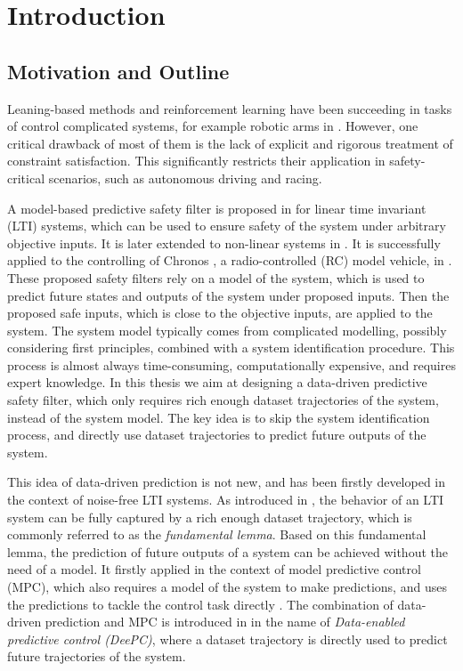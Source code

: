 \chapter{Introduction}\label{chap:introduction}


\section{Motivation and Outline}\label{sec:motivation-and-background}

Leaning-based methods and reinforcement learning have been succeeding in tasks of control complicated systems, for example robotic arms in \cite{levineEndtoEndTrainingDeep2016}.
However, one critical drawback of most of them is the lack of explicit and rigorous treatment of constraint satisfaction.
This significantly restricts their application in safety-critical scenarios, such as autonomous driving and racing.

A model-based predictive safety filter is proposed in \cite{wabersichLinearModelPredictive2018} for linear time invariant (LTI) systems, which can be used to ensure safety of the system under arbitrary objective inputs.
It is later extended to non-linear systems in \cite{wabersichPredictiveSafetyFilter2021a}.
It is successfully applied to the controlling of Chronos \cite{carronChronosCRSDesign2022}, a radio-controlled (RC) model vehicle, in \cite{tearlePredictiveSafetyFilterRacing2021}.
These proposed safety filters rely on a model of the system, which is used to predict future states and outputs of the system under proposed inputs.
Then the proposed safe inputs, which is close to the objective inputs, are applied to the system.
The system model typically comes from complicated modelling, possibly considering first principles, combined with a system identification procedure.
This process is almost always time-consuming, computationally expensive, and requires expert knowledge.
In this thesis we aim at designing a data-driven predictive safety filter, which only requires rich enough dataset trajectories of the system, instead of the system model.
The key idea is to skip the system identification process, and directly use dataset trajectories to predict future outputs of the system.

This idea of data-driven prediction is not new, and has been firstly developed in the context of noise-free LTI systems.
As introduced in \cite{willemsNotePersistencyExcitation2005}, the behavior of an LTI system can be fully captured by a rich enough dataset trajectory, which is commonly referred to as the \emph{fundamental lemma}.
Based on this fundamental lemma, the prediction of future outputs of a system can be achieved without the need of a model.
It firstly applied in the context of model predictive control (MPC), which also requires a model of the system to make predictions, and uses the predictions to tackle the control task directly \cite{garciaModelPredictiveControl1989}.
The combination of data-driven prediction and MPC is introduced in \cite{coulsonDataenabledPredictiveControl2019} in the name of \emph{Data-enabled predictive control (DeePC)}, where a dataset trajectory is directly used to predict future trajectories of the system.

